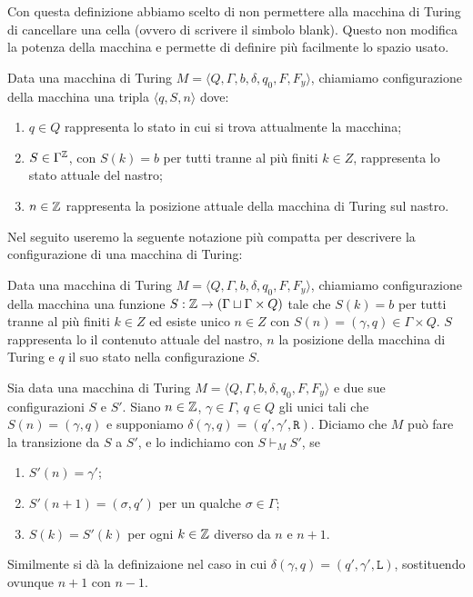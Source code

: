 \begin{osservazione}
 Con questa definizione abbiamo scelto di non permettere alla macchina di Turing
 di cancellare una cella (ovvero di scrivere il simbolo blank).
 Questo non modifica la potenza della macchina e permette di definire più facilmente
 lo spazio usato.
\end{osservazione}


\begin{definizione}
 Data una macchina di Turing $M=\langle Q, \Gamma, b, \delta, q_0, F, F_y \rangle$,
 chiamiamo configurazione della macchina una tripla
 $\langle q, S, n \rangle$ dove:
 \begin{enumerate}
  \item $q \in Q$ rappresenta lo stato in cui si trova attualmente la macchina;
  \item $S \in \Gamma ^ {\mathbb{Z}}$, con $S(k)=b$ per tutti tranne al più finiti $k \in Z$,
  rappresenta lo stato attuale del nastro;
  \item $n \in \mathbb{Z}$ rappresenta la posizione attuale della macchina di Turing
  sul nastro.
 \end{enumerate}
\end{definizione}
Nel seguito useremo la seguente notazione più compatta per descrivere la
configurazione di una macchina di Turing:
\begin{definizione}
 Data una macchina di Turing $M=\langle Q, \Gamma, b, \delta, q_0, F, F_y \rangle$,
 chiamiamo configurazione della macchina una funzione
 $S: \mathbb{Z} \to (\Gamma \sqcup \Gamma \times Q)$  tale che $S(k)=b$ per
 tutti tranne al più finiti $k \in Z$ ed esiste unico $n \in Z$ con
 $S(n) = (\gamma, q) \in \Gamma \times Q$.
 $S$ rappresenta lo il contenuto attuale del nastro, $n$ la posizione della
 macchina di Turing e $q$ il suo stato nella configurazione $S$.
\end{definizione}

\begin{definizione}
 Sia data una macchina di Turing $M=\langle Q, \Gamma, b, \delta, q_0, F, F_y \rangle$
 e due sue configurazioni $S$ e $S'$.
 Siano $n \in \mathbb{Z}$, $\gamma \in \Gamma$, $q \in Q$ gli unici tali che
 $S(n) = (\gamma, q)$ e supponiamo $\delta(\gamma, q) = (q', \gamma', \texttt{R})$.
 Diciamo che
 $M$ può fare la transizione da $S$ a $S'$, e lo indichiamo con $S \vdash_M S'$,
 se 
 \begin{enumerate}
  \item $S'(n)=\gamma'$;
  \item $S'(n+1)=(\sigma, q')$ per un
 qualche $\sigma \in \Gamma$;
  \item $S(k) = S'(k)$ per ogni $k \in \mathbb{Z}$ diverso da
 $n$ e $n+1$.
 \end{enumerate}
 Similmente si dà la definizaione nel caso in cui
 $\delta(\gamma, q) = (q', \gamma', \texttt{L})$,
 sostituendo ovunque $n+1$ con $n-1$.
\end{definizione}

